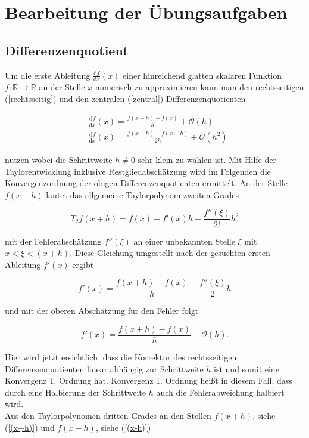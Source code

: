 \chapter{Bearbeitung der Übungsaufgaben}

\section{Differenzenquotient}

Um die erste Ableitung $\frac{\mathrm{d}f}{\mathrm{d}x}(x)$ einer hinreichend glatten skalaren Funktion $f: \mathbb{R} \rightarrow \mathbb{R}$ an der Stelle $x$ numerisch zu approximieren kann man den rechtsseitigen (\ref{rechtsseitig}) und den zentralen (\ref{zentral}) Differenzenquotienten 

\begin{align}
	&\frac{\mathrm{d}f}{\mathrm{d}x}(x) = \frac{f(x+h)-f(x)}{h} + \mathcal{O}(h) \label{rechtsseitig}
	\\	
	&\frac{\mathrm{d}f}{\mathrm{d}x}(x) = \frac{f(x+h)-f(x-h)}{2h} + \mathcal{O}(h^{2})
	\label{zentral}
\end{align}

nutzen wobei die Schrittweite $h \neq 0$ sehr klein zu wählen ist. Mit Hilfe der Taylorentwicklung inklusive Restgliedabschätzung wird im Folgenden die Konvergenzordnung der obigen Differenzenquotienten ermittelt. An der Stelle $f(x+h)$ lautet das allgemeine Taylorpolynom zweiten Grades 

\begin{equation*}
	T_2f(x+h)= f(x) +f'(x)h +\frac{f''(\xi)}{2!}h^2
\end{equation*}

mit der Fehlerabschätzung $f''(\xi)$ an einer unbekannten Stelle $\xi$ mit $ x <\xi <(x+h)$. Diese Gleichung umgestellt nach der gesuchten ersten Ableitung $f'(x)$ ergibt 

\begin{equation}
	f'(x) = \frac{f(x+h)-f(x)}{h}-\frac{f''(\xi)}{2}h
	\label{mitFehler}
\end{equation}

und mit der oberen Abschätzung für den Fehler folgt 

\begin{equation}
	f'(x) = \frac{f(x+h)-f(x)}{h}+\mathcal{O}(h).
	\label{ohneFehler}
\end{equation}

Hier wird jetzt ersichtlich, dass die Korrektur des rechtsseitigen Differenzenquotienten linear abhängig zur Schrittweite $h$ ist und somit eine Konvergenz 1. Ordnung hat. Konvergenz 1. Ordnung heißt in diesem Fall, dass durch eine Halbierung der Schrittweite $h$ auch die Fehlerabweichung halbiert wird.\\
Aus den Taylorpolynomen dritten Grades an den Stellen $f(x+h)$, siehe (\ref{(x+h)}) und $f(x-h)$, siehe (\ref{(x-h)})

